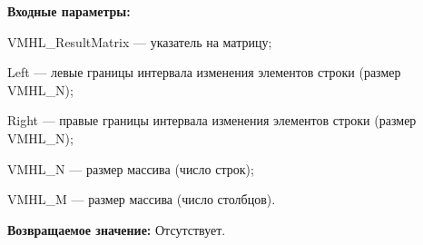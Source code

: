 \textbf{Входные параметры:}

 VMHL\_ResultMatrix --- указатель на матрицу;
 
 Left --- левые границы интервала изменения элементов строки (размер VMHL\_N);
 
 Right --- правые границы интервала изменения элементов строки (размер VMHL\_N);
 
 VMHL\_N --- размер массива (число строк);
 
 VMHL\_M --- размер массива (число столбцов).

\textbf{Возвращаемое значение:}
Отсутствует.